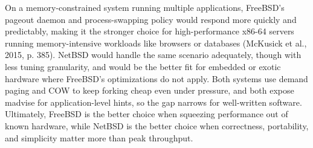 On a memory-constrained system running multiple applications, FreeBSD's pageout daemon and process-swapping policy would respond more quickly and predictably, making it the stronger choice for high-performance x86-64 servers running memory-intensive workloads like browsers or databases (McKusick et al., 2015, p. 385). NetBSD would handle the same scenario adequately, though with less tuning granularity, and would be the better fit for embedded or exotic hardware where FreeBSD's optimizations do not apply. Both systems use demand paging and COW to keep forking cheap even under pressure, and both expose madvise for application-level hints, so the gap narrows for well-written software. Ultimately, FreeBSD is the better choice when squeezing performance out of known hardware, while NetBSD is the better choice when correctness, portability, and simplicity matter more than peak throughput.